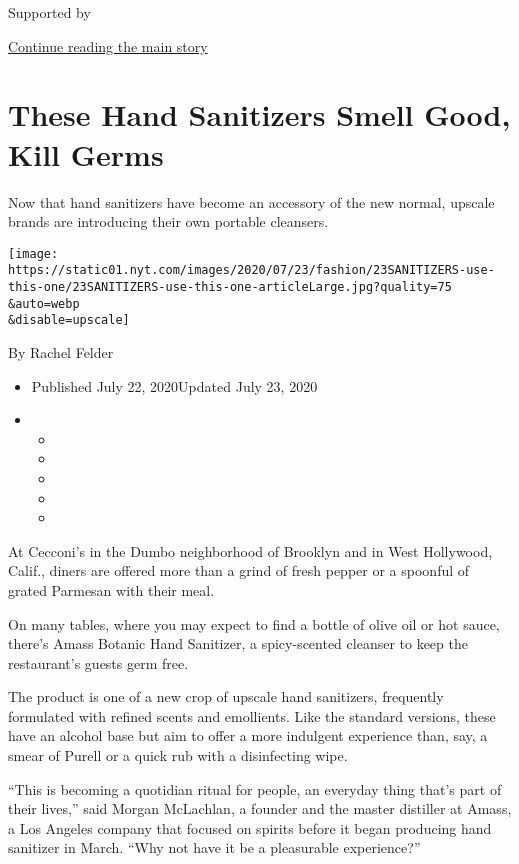 Supported by

\protect\hyperlink{after-sponsor}{Continue reading the main story}

\hypertarget{these-hand-sanitizers-smell-good-kill-germs}{%
\section{These Hand Sanitizers Smell Good, Kill
Germs}\label{these-hand-sanitizers-smell-good-kill-germs}}

Now that hand sanitizers have become an accessory of the new normal,
upscale brands are introducing their own portable cleansers.

\texttt{[image: https://static01.nyt.com/images/2020/07/23/fashion/23SANITIZERS-use-this-one/23SANITIZERS-use-this-one-articleLarge.jpg?quality=75\\\&auto=webp\\\&disable=upscale]}

By Rachel Felder

\begin{itemize}
\item
  Published July 22, 2020Updated July 23, 2020
\item
  \begin{itemize}
  \item
  \item
  \item
  \item
  \item
  \end{itemize}
\end{itemize}

At Cecconi's in the Dumbo neighborhood of Brooklyn and in West
Hollywood, Calif., diners are offered more than a grind of fresh pepper
or a spoonful of grated Parmesan with their meal.

On many tables, where you may expect to find a bottle of olive oil or
hot sauce, there's Amass Botanic Hand Sanitizer, a spicy-scented
cleanser to keep the restaurant's guests germ free.

The product is one of a new crop of upscale hand sanitizers, frequently
formulated with refined scents and emollients. Like the standard
versions, these have an alcohol base but aim to offer a more indulgent
experience than, say, a smear of Purell or a quick rub with a
disinfecting wipe.

``This is becoming a quotidian ritual for people, an everyday thing
that's part of their lives,'' said Morgan McLachlan, a founder and the
master distiller at Amass, a Los Angeles company that focused on spirits
before it began producing hand sanitizer in March. ``Why not have it be
a pleasurable experience?''

